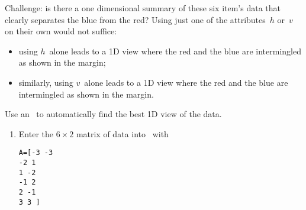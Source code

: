 \begin{example}
Challenge: is there a one dimensional summary of these six item's data that clearly separates the blue from the red?
Using just one of the attributes~\(h\) or~\(v\) on their own would not suffice:
%
\begin{itemize}
\item using \(h\)~alone leads to a 1D view where the red and the blue are intermingled as shown in the margin;
%
\item similarly, using \(v\)~alone leads to a 1D view where the red and the blue are intermingled as shown in the margin.
\end{itemize}

\begin{solution} 
Use an \svd\ to automatically find the best 1D view of the data.
\begin{enumerate}
\item Enter the \(6\times2\) matrix of data into \script\ with
\begin{verbatim}
A=[-3 -3
-2 1
1 -2
-1 2
2 -1
3 3 ]
\end{verbatim}
\setbox\ajrqrbox\hbox{}%
\marginpar{\usebox{\ajrqrbox\\[2ex]}}%


\end{enumerate}
\end{solution}
\end{example}
